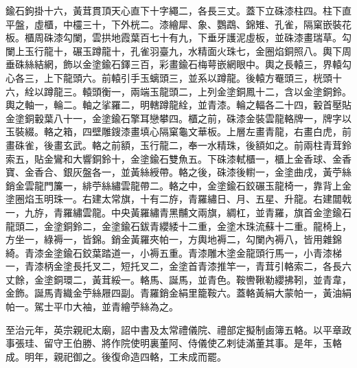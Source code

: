 \begin{pinyinscope}
 鍮石鉤掛十六，黃茸貫頂天心直下十字繩二，各長三丈。蓋下立硃漆柱四。柱下直平盤，虛櫃，中欞三十，下外桄二。漆繪犀、象、鸚鵡、錦雉、孔雀，隔窠嵌裝花板。櫃周硃漆勾闌，雲拱地霞葉百七十有九，下垂牙護泥虛板，並硃漆畫瑞草。勾闌上玉行龍十，碾玉蹲龍十，孔雀羽臺九，水精面火珠七，金圈焰銅照八。輿下周垂硃絲結網，飾以金塗鍮石鐸三百，彩畫鍮石梅萼嵌網眼中。輿之長轅三，界轅勾心各三，上下龍頭六。前轅引手玉螭頭三，並系以蹲龍。後轅方罨頭三，桄頭十六，絟以蹲龍三。轅頭衡一，兩端玉龍頭二，上列金塗銅鳳十二，含以金塗銅鈴。輿之軸一，輪二。軸之挲羅二，明轄蹲龍絟，並青漆。輪之輻各二十四，轂首壓貼金塗銅轂葉八十一，金塗鍮石擎耳戀攀四。櫃之前，硃漆金裝雲龍輅牌一，牌字以玉裝綴。輅之箱，四壁雕鎪漆畫填心隔窠龜文華板。上層左畫青龍，右畫白虎，前畫硃雀，後畫玄武。輅之前額，玉行龍二，奉一水精珠，後額如之。前兩柱青茸鈴索五，貼金鸞和大響銅鈴十，金塗鍮石雙魚五。下硃漆軾櫃一，櫃上金香球、金香寶、金香合、銀灰盤各一，並黃絲綬帶。輅之後，硃漆後轛一，金塗曲戌，黃苧絲銷金雲龍門簾一，緋苧絲繡雲龍帶二。輅之中，金塗鍮石鉸碾玉龍椅一，靠背上金塗圈焰玉明珠一。右建太常旗，十有二斿，青羅繡日、月、五星、升龍。右建闒戟一，九斿，青羅繡雲龍。中央黃羅繡青黑黼文兩旗，綢杠，並青羅，旗首金塗鍮石龍頭二，金塗銅鈴二，金塗鍮石鈸青纓緌十二重，金塗木珠流蘇十二重。龍椅上，方坐一，綠褥一，皆錦。銷金黃羅夾帕一，方輿地褥二，勾闌內褥八，皆用雜錦綺。青漆金塗鍮石鉸葉踏道一，小褥五重。青漆雕木塗金龍頭行馬一，小青漆梯一，青漆柄金塗長托叉二，短托叉二，金塗首青漆推竿一，青茸引輅索二，各長六丈餘，金塗銅環二，黃茸綏一。輅馬、誕馬，並青色。鞍轡鞦勒纓拂靷，並青韋，金飾。誕馬青織金苧絲屜四副。青羅銷金絹里籠鞍六。蓋輅黃絹大蒙帕一，黃油絹帕一。駕士平巾大袖，並青繪苧絲為之。



 至治元年，英宗親祀太廟，詔中書及太常禮儀院、禮部定擬制鹵簿五輅。以平章政事張珪、留守王伯勝、將作院使明裏董阿、侍儀使乙剌徒滿董其事。是年，玉輅成。明年，親祀御之。後復命造四輅，工未成而罷。




\end{pinyinscope}
